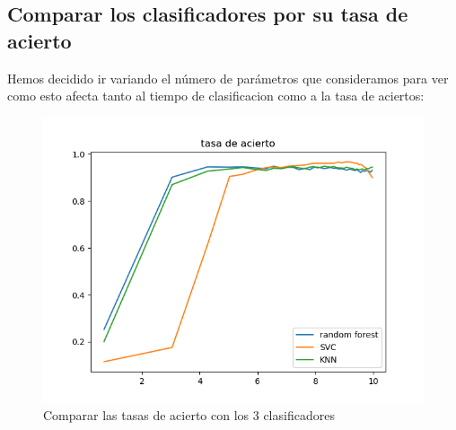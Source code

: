 \documentclass[8pt,a4paper]{article}
\begin{document}
\subsection{Comparar los clasificadores por su tasa de acierto}

Hemos decidido ir variando el número de parámetros que consideramos para ver como esto afecta tanto al tiempo de clasificacion como a la tasa de aciertos:
\begin{figure}[htbp]
    \centering
    \includegraphics[width=\textwidth]{./CompararAciertos.png}
    \caption{Comparar las tasas de acierto con los 3 clasificadores}
\end{figure}
\end{document}
